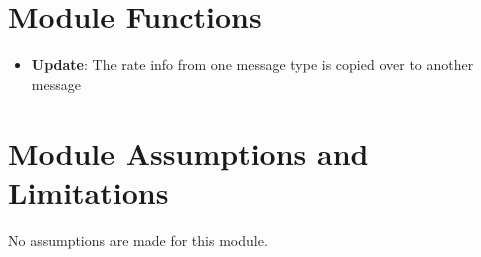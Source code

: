 

\section{Module Functions}

\begin{itemize}
	\item \textbf{Update}: The rate info from one message type is copied over to another message
\end{itemize}

\section{Module Assumptions and Limitations}
No assumptions are made for this module.